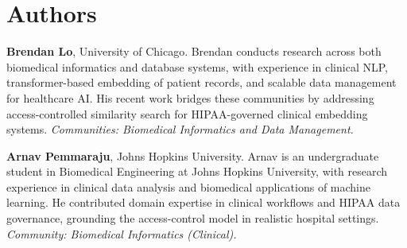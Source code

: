 \section*{Authors}

\noindent\textbf{Brendan Lo}, University of Chicago.
Brendan conducts research across both biomedical informatics and database
systems, with experience in clinical NLP, transformer-based embedding of
patient records, and scalable data management for healthcare AI.
His recent work bridges these communities by addressing access-controlled
similarity search for HIPAA-governed clinical embedding systems.
\emph{Communities: Biomedical Informatics and Data Management.}

\smallskip
\noindent\textbf{Arnav Pemmaraju}, Johns Hopkins University.
Arnav is an undergraduate student in Biomedical Engineering at Johns Hopkins
University, with research experience in clinical data analysis and
biomedical applications of machine learning.
He contributed domain expertise in clinical workflows and HIPAA data governance,
grounding the access-control model in realistic hospital settings.
\emph{Community: Biomedical Informatics (Clinical).}
